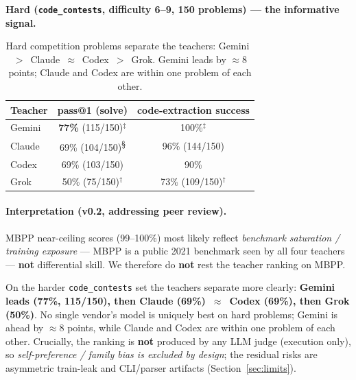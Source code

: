 \documentclass[11pt]{article}
\begin{document}
\textbf{Hard (\texttt{code\_contests}, difficulty 6--9, 150 problems) --- the informative signal.}
\begin{table}[h]\centering
\begin{tabular}{lcc}
\toprule
Teacher & pass@1 (solve) & code-extraction success \\
\midrule
Gemini & \textbf{77\%} (115/150)$^{\ddagger}$ & 100\%$^{\ddagger}$ \\
Claude & 69\% (104/150)\textsuperscript{\S} & 96\% (144/150) \\
Codex  & 69\% (103/150)          & 90\% \\
Grok   & 50\% (75/150)$^{\dagger}$ & 73\% (109/150)$^{\dagger}$ \\
\bottomrule
\end{tabular}
\caption{Hard competition problems separate the teachers: Gemini~$>$~Claude~$\approx$~Codex~$>$~Grok.
Gemini leads by $\approx$8 points; Claude and Codex are within one problem of each other.}
\end{table}

\paragraph{Interpretation (v0.2, addressing peer review).}
MBPP near-ceiling scores (99--100\%) most likely reflect \emph{benchmark saturation / training
exposure} --- MBPP is a public 2021 benchmark seen by all four teachers --- \textbf{not}
differential skill. We therefore do \textbf{not} rest the teacher ranking on MBPP.

On the harder \texttt{code\_contests} set the teachers separate more clearly:
\textbf{Gemini leads (77\%, 115/150), then Claude (69\%)~$\approx$~Codex (69\%), then Grok (50\%)}.
No single vendor's model is uniquely best on hard problems; Gemini is ahead by $\approx$8 points,
while Claude and Codex are within one problem of each other. Crucially, the ranking is \textbf{not}
produced by any LLM judge (execution only), so \emph{self-preference / family bias is excluded by
design}; the residual risks are asymmetric train-leak and CLI/parser artifacts
(Section~\ref{sec:limits}).
\end{document}
